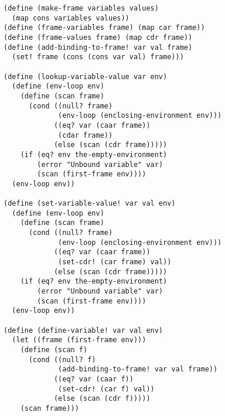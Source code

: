 \documentclass[a4paper,12pt]{article}
\begin{document}
\begin{lstlisting}
(define (make-frame variables values)
  (map cons variables values))
(define (frame-variables frame) (map car frame))
(define (frame-values frame) (map cdr frame))
(define (add-binding-to-frame! var val frame)
  (set! frame (cons (cons var val) frame)))

(define (lookup-variable-value var env)
  (define (env-loop env)
    (define (scan frame)
      (cond ((null? frame)
             (env-loop (enclosing-environment env)))
            ((eq? var (caar frame))
             (cdar frame))
            (else (scan (cdr frame)))))
    (if (eq? env the-empty-environment)
        (error "Unbound variable" var)
        (scan (first-frame env))))
  (env-loop env))

(define (set-variable-value! var val env)
  (define (env-loop env)
    (define (scan frame)
      (cond ((null? frame)
             (env-loop (enclosing-environment env)))
            ((eq? var (caar frame))
             (set-cdr! (car frame) val))
            (else (scan (cdr frame)))))
    (if (eq? env the-empty-environment)
        (error "Unbound variable" var)
        (scan (first-frame env))))
  (env-loop env))

(define (define-variable! var val env)
  (let ((frame (first-frame env)))
    (define (scan f)
      (cond ((null? f)
             (add-binding-to-frame! var val frame))
            ((eq? var (caar f))
             (set-cdr! (car f) val))
            (else (scan (cdr f)))))
    (scan frame)))
\end{lstlisting}
\end{document}
